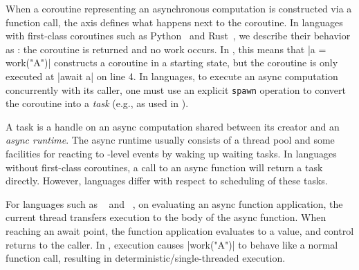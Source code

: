When a coroutine representing an asynchronous computation is constructed via a function call, the \eagerness axis defines what happens next to the coroutine. In languages with first-class coroutines\footnotemark{} such as Python~\cite{selivanov_pep_2015} and Rust~\cite{withoutboats_2394_2018}, we describe their behavior as \lazy: the coroutine is returned and no work occurs. In , this means that \code|a = work("A")| constructs a coroutine in a starting state, but the coroutine is only executed at \code|await a| on line 4. In \lazy languages, to execute an async computation concurrently with its caller, one must use an explicit \lstinline[language=Pseudo]|spawn| operation to convert the coroutine into a \emph{task} (e.g., as used in ).
%

A task is a handle on an async computation shared between its creator and an \emph{async runtime}. The async runtime usually consists of a thread pool and some facilities for reacting to -level events by waking up waiting tasks. In languages without first-class coroutines, a call to an async function will return a task directly. However, languages differ with respect to scheduling of these tasks.


For \eager languages such as \CSharp~\cite[.3]{ecma_c_standard_committee_c_nodate} and \Js~\cite[.5.1]{ecma_ecmascript_nodate}, on evaluating an async function application, the current thread transfers execution to the body of the async function. When reaching an await point, the function application evaluates to a \task value, and control returns to the caller. In , \eager execution causes \code|work("A")| to behave like a normal function call, resulting in deterministic/single-threaded execution.


